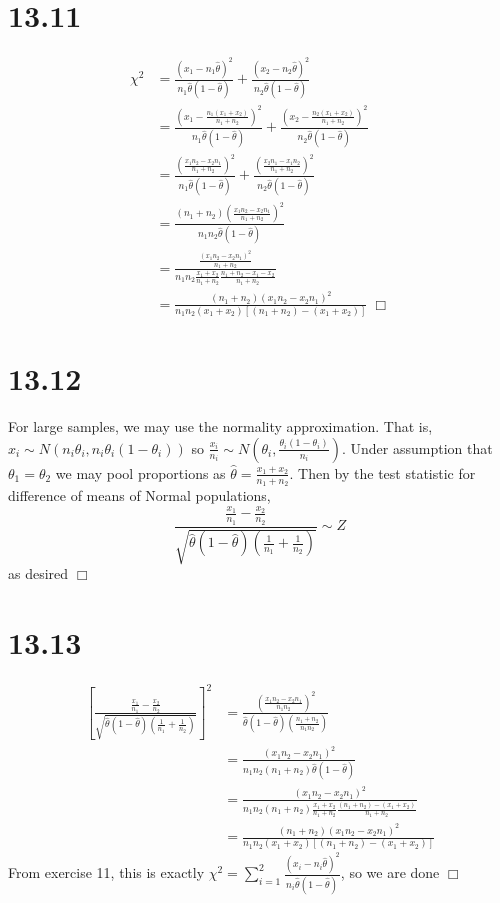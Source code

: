 \documentclass{article}
\begin{document}
\section*{13.11}
\begin{equation*}
\begin{split}
\chi^2 &= \frac{(x_1-n_1\hat{\theta})^2}{n_1\hat{\theta}(1-\hat{\theta})} + \frac{(x_2-n_2\hat{\theta})^2}{n_2\hat{\theta}(1-\hat{\theta})}\\
&= \frac{(x_1-\frac{n_1(x_1+x_2)}{n_1+n_2})^2}{n_1\hat{\theta}(1-\hat{\theta})} + \frac{(x_2-\frac{n_2(x_1+x_2)}{n_1+n_2})^2}{n_2\hat{\theta}(1-\hat{\theta})}\\
&= \frac{(\frac{x_1n_2-x_2n_1}{n_1+n_2})^2}{n_1\hat{\theta}(1-\hat{\theta})} + \frac{(\frac{x_2n_1-x_1n_2}{n_1+n_2})^2}{n_2\hat{\theta}(1-\hat{\theta})}\\
&= \frac{(n_1+n_2)(\frac{x_1n_2-x_2n_1}{n_1+n_2})^2}{n_1n_2\hat{\theta}(1-\hat{\theta})}\\
&= \frac{\frac{(x_1n_2-x_2n_1)^2}{n_1+n_2}}{n_1n_2\frac{x_1+x_2}{n_1+n_2}\frac{n_1+n_2-x_1-x_2}{n_1+n_2}}\\
&= \frac{(n_1+n_2)(x_1n_2-x_2n_1)^2}{n_1n_2(x_1+x_2)[(n_1+n_2)-(x_1+x_2)]} \; \Box
\end{split}
\end{equation*}

\section*{13.12}
For large samples, we may use the normality approximation. That is, $x_i \sim N(n_i\theta_i, n_i\theta_i(1-\theta_i))$ so $\frac{x_i}{n_i} \sim N(\theta_i, \frac{\theta_i(1-\theta_i)}{n_i})$. Under assumption that $\theta_1 = \theta_2$ we may pool proportions as $\hat{\theta} = \frac{x_1+x_2}{n_1+n_2}$. Then by the test statistic for difference of means of Normal populations,
$$\frac{\frac{x_1}{n_1}-\frac{x_2}{n_2}}{\sqrt{\hat{\theta}(1-\hat{\theta})\left(\frac{1}{n_1}+\frac{1}{n_2}\right)}} \sim Z$$
as desired $\Box$

\section*{13.13}
\begin{equation*}
\begin{split}
\left[\frac{\frac{x_1}{n_1}-\frac{x_2}{n_2}}{\sqrt{\hat{\theta}(1-\hat{\theta})\left(\frac{1}{n_1}+\frac{1}{n_2}\right)}}\right]^2 &= \frac{\left(\frac{x_1n_2-x_2n_1}{n_1n_2}\right)^2}{\hat{\theta}(1-\hat{\theta})\left(\frac{n_1+n_2}{n_1n_2}\right)}\\
&= \frac{(x_1n_2-x_2n_1)^2}{n_1n_2(n_1+n_2)\hat{\theta}(1-\hat{\theta})}\\
&= \frac{(x_1n_2-x_2n_1)^2}{n_1n_2(n_1+n_2)\frac{x_1+x_2}{n_1+n_2}\frac{(n_1+n_2)-(x_1+x_2)}{n_1+n_2}}\\
&= \frac{(n_1+n_2)(x_1n_2-x_2n_1)^2}{n_1n_2(x_1+x_2)[(n_1+n_2)-(x_1+x_2)]}
\end{split}
\end{equation*}
From exercise 11, this is exactly $\chi^2 = \sum\limits^2_{i=1} \frac{(x_i-n_i\hat{\theta})^2}{n_i\hat{\theta}(1-\hat{\theta})}$, so we are done $\Box$
\end{document}

